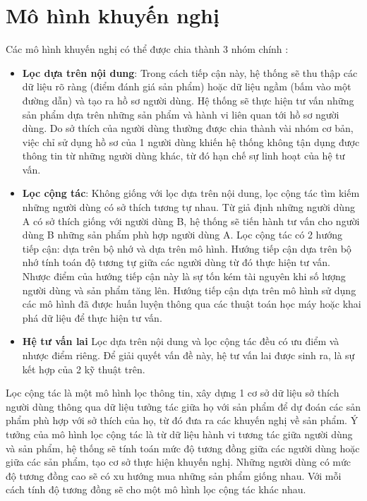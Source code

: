 \section{Mô hình khuyến nghị}
Các mô hình khuyến nghị có thể được chia thành 3 nhóm chính \cite{goyani2020review}:
\begin{itemize}
    \item \textbf{Lọc dựa trên nội dung}: Trong cách tiếp cận này, hệ thống sẽ thu thập các dữ
    liệu rõ ràng (điểm đánh giá sản phẩm) hoặc dữ liệu ngầm (bấm vào một đường
    dẫn) và tạo ra hồ sơ người dùng. Hệ thống sẽ thực hiện tư vấn những sản phẩm
    dựa trên những sản phẩm và hành vi liên quan tới hồ sơ người dùng. Do sở thích 
    của người dùng thường được chia thành vài nhóm cơ bản, việc chỉ sử dụng hồ sơ
    của 1 người dùng khiến hệ thống không tận dụng được thông tin từ những người
    dùng khác, từ đó hạn chế sự linh hoạt của hệ tư vấn.

    \item \textbf{Lọc cộng tác}: Không giống với lọc dựa trên nội dung, lọc cộng tác tìm kiếm
    những người dùng có sở thích tương tự nhau. Từ giả định những người dùng A
    có sở thích giống với người dùng B, hệ thống sẽ tiến hành tư vấn cho người dùng
    B những sản phẩm phù hợp người dùng A. Lọc cộng tác có 2 hướng tiếp cận: dựa
    trên bộ nhớ và dựa trên mô hình. Hướng tiếp cận dựa trên bộ nhớ tính toán độ
    tương tự giữa các người dùng từ đó thực hiện tư vấn. Nhược điểm của hướng tiếp
    cận này là sự tốn kém tài nguyên khi số lượng người dùng và sản phẩm tăng lên.
    Hướng tiếp cận dựa trên mô hình sử dụng các mô hình đã được huấn luyện thông
    qua các thuật toán học máy hoặc khai phá dữ liệu để thực hiện tư vấn.

    \item \textbf{Hệ tư vấn lai} Lọc dựa trên nội dung và lọc cộng tác đều có ưu điểm và nhược
    điểm riêng. Để giải quyết vấn đề này, hệ tư vấn lai được sinh ra, là sự kết hợp
    của 2 kỹ thuật trên.
\end{itemize}

Lọc cộng tác là một mô hình lọc thông tin, xây dựng 1 cơ sở dữ liệu sở thích người dùng 
thông qua dữ liệu tưởng tác giữa họ với sản phẩm để dự đoán các sản phẩm phù hợp với sở thích của họ, 
từ đó đưa ra các khuyến nghị về sản phẩm. Ý tưởng của mô hình lọc cộng tác là từ dữ liệu hành vi
tương tác giữa người dùng và sản phẩm, hệ thống sẽ tính toán mức độ tương đồng giữa các người dùng
hoặc giữa các sản phẩm, tạo cơ sở thực hiện khuyến nghị. Những người dùng có mức độ tương đồng cao
sẽ có xu hướng mua những sản phẩm giống nhau. Với mỗi cách tính độ tương đồng sẽ cho một mô hình lọc cộng tác 
khác nhau.

